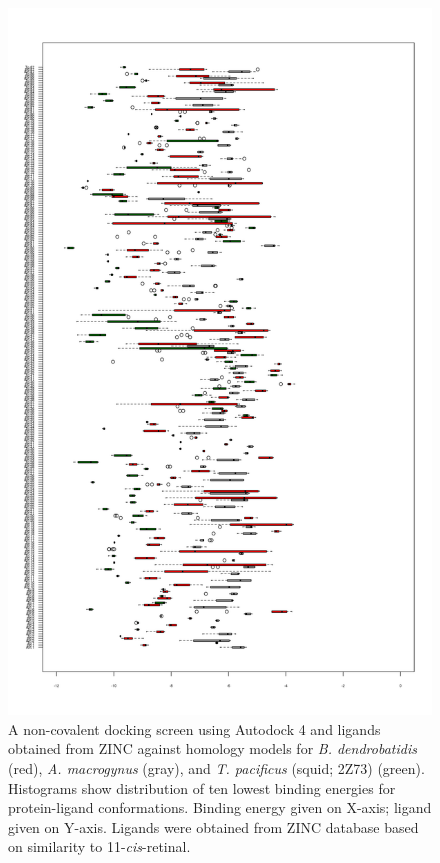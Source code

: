 \begin{figure}[hb]
  \centering
  \includegraphics[]{./Chapter_RhodStruct/img/dockPlot.png}
  \caption[Docking screen for \textit{Bd} and \textit{Am} models]{A non-covalent docking screen using Autodock 4 and ligands obtained from ZINC against homology models for \textit{B. dendrobatidis} (red), \textit{A. macrogynus} (gray), and \textit{T. pacificus} (squid; 2Z73) (green). Histograms show distribution of ten lowest binding energies for protein-ligand conformations. Binding energy given on X-axis; ligand given on Y-axis. Ligands were obtained from ZINC database based on similarity to 11-\textit{cis}-retinal.}
  \label{fig:ChRhodS_NonCovDock}
\end{figure}

